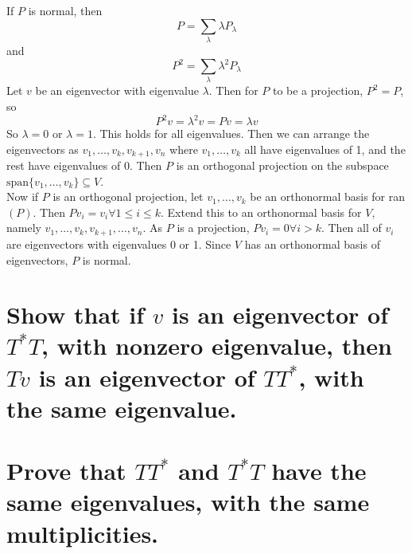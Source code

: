 \documentclass[answers]{exam}
\begin{document}
\begin{questions}

\begin{solution}
	If $P$ is normal, then
	$$P = \sum_\lambda \lambda P_\lambda$$
	and
	$$P^2 = \sum_\lambda \lambda^2 P_\lambda$$
	Let $v$ be an eigenvector with eigenvalue $\lambda$. Then for $P$ to be a projection, $P^2 = P$, so
	$$P^2v = \lambda^2 v = Pv = \lambda v$$
	So $\lambda = 0$ or $\lambda = 1$. This holds for all eigenvalues. Then we can arrange the eigenvectors as $v_1,\dots,v_k,v_{k+1},v_n$ where $v_1,\dots,v_k$ all have eigenvalues of 1, and the rest have eigenvalues of 0. Then $P$ is an orthogonal projection on the subspace $\text{span}\{v_1,\dots,v_k\} \subseteq V$. \\
	Now if $P$ is an orthogonal projection, let $v_1,\dots,v_k$ be an orthonormal basis for ran$(P)$. Then $Pv_i = v_i \forall 1 \leq i \leq k$. Extend this to an orthonormal basis for $V$, namely $v_1,\dots,v_k,v_{k+1},\dots,v_n$. As $P$ is a projection, $Pv_i = 0 \forall i > k$. Then all of $v_i$ are eigenvectors with eigenvalues 0 or 1. Since $V$ has an orthonormal basis of eigenvectors, $P$ is normal.
\end{solution}


\begin{parts}
	\part{Show that if $v$ is an eigenvector of $T^*T$, with nonzero eigenvalue, then $Tv$ is an eigenvector of $TT^*$, with the same eigenvalue.}
	\part{Prove that $TT^*$ and $T^*T$ have the same eigenvalues, with the same multiplicities.}
\end{parts}


\end{questions}
\end{document}
